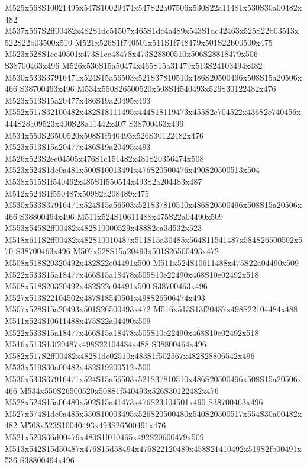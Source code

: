 \documentclass{article}
\begin{document}
\begin{multicols}{2}
M525x568S10021495x547S10029474x547S22a07506x530S22a11481x530S30a00482x482 M537x567S2ff00482x482S1dc51507x465S1dc4a489x543S1dc42463x525S22b03513x522S22b03500x510 M521x526S1f740501x511S1f748479x501S22b00500x475 M523x528S1ce40501x473S1ce48478x473S28800510x506S28818479x506 S38700463x496 M526x536S15a50474x465S15a31479x513S24103494x482 M530x533S37916471x524S15a56503x521S37810510x486S20500496x508S15a20506x466 S38700463x496 M534x550S26500520x508S1f540493x526S30122482x476 M523x513S15a20477x486S19a20495x493 M552x517S32100482x482S18111495x444S18119473x455S2e704522x436S2e740456x444S28a09523x400S28a11442x407 S38700463x496 M534x550S26500520x508S1f540493x526S30122482x476 M523x513S15a20477x486S19a20495x493 M526x523S2ee04505x476S1c151482x481S20356474x508 M523x524S1dc0a481x500S10013491x476S20500476x490S20500513x504 M538x515S1f540462x485S1f550514x493S2a204483x487 M512x524S1f550487x509S2a208489x475 M530x533S37916471x524S15a56503x521S37810510x486S20500496x508S15a20506x466 S38800464x496 M511x524S10611488x475S22a04490x509 M553x545S2ff00482x482S10000529x488S2ea3d532x523 M518x611S2ff00482x482S10010487x511S15a30485x564S11541487x584S26500502x570 S38700463x496 M507x528S15a20493x501S26500493x472 M508x518S20320492x482S22e04491x500 M511x524S10611488x475S22a04490x509 M522x533S15a18477x466S15a18478x505S10e22490x468S10e02492x518 M508x518S20320492x482S22e04491x500 S38700463x496 M527x513S22104502x487S18540501x498S26506474x493 M507x528S15a20493x501S26500493x472 M516x513S13f20487x498S22104484x488 M511x524S10611488x475S22a04490x509 M522x533S15a18477x466S15a18478x505S10e22490x468S10e02492x518 M516x513S13f20487x498S22104484x488 S38800464x496 M582x517S2ff00482x482S1dc02510x483S1f502567x482S28806542x496 M533x519S30a00482x482S19200512x500 M530x533S37916471x524S15a56503x521S37810510x486S20500496x508S15a20506x466 M534x550S26500520x508S1f540493x526S30122482x476 M528x524S15a06480x502S15a41473x476S23d04501x490 S38700463x496 M527x574S1dc0a485x550S10003495x526S20500480x540S20500517x554S30a00482x482 M508x523S10040493x493S26500491x476 M521x520S36d00479x480S1f010465x492S20600479x509 M513x542S15d50487x476S15d58494x476S22120489x458S21410492x519S2fb00491x536 S38800464x496




\end{multicols}
\end{document}
